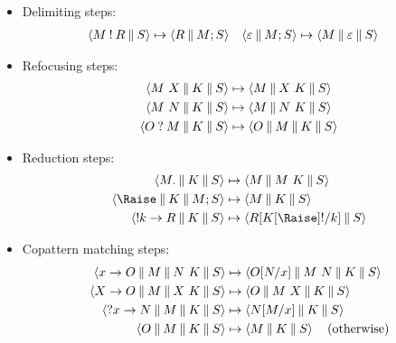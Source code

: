 \documentclass[sigplan,screen]{acmart}
\begin{document}
\begin{itemize}
\item Delimiting steps:
\begin{align*}
  \braket{M \ans R \cmid S}
  &\mapsto
  \braket{R \cmid M; S}
  &
  \braket{\varepsilon \cmid M; S}
  &\mapsto
  \braket{M \cmid \varepsilon \cmid S}
\end{align*}

\item Refocusing steps:
  \begin{align*}
  \braket{M ~ X \cmid K \cmid S}
  &\mapsto
  \braket{M \cmid X ~ K \cmid S}
  \\
  \braket{M ~ N \cmid K \cmid S}
  &\mapsto
  \braket{M \cmid N ~ K \cmid S}
  \\
  \braket{O \ask M \cmid K \cmid S}
  &\mapsto
  \braket{O \cmid M \cmid K \cmid S}
\end{align*}

\item Reduction steps:
  \begin{align*}
  \braket{M. \cmid K \cmid S}
  &\mapsto
  \braket{M \cmid M ~ K \cmid S}
  \\
  \braket{{\Raise} \cmid K \cmid M; S}
  &\mapsto
  \braket{M \cmid K \cmid S}
  \\
  \braket{\ans k \to R \cmid K \cmid S}
  &\mapsto
  \braket{R\subst{k}{K[\Raise]\ans} \cmid S}
\end{align*}

\item Copattern matching steps:
  \begin{align*}
  \braket{x \to O \cmid M \cmid N~K \cmid S}
  &\mapsto
  \braket{O\subst{x}{N} \cmid M~N \cmid K \cmid S}
  \\
  \braket{X \to O \cmid M \cmid X~K \cmid S}
  &\mapsto
  \braket{O \cmid M~X \cmid K \cmid S}
  \\
  \braket{\ask x \to N \cmid M \cmid K \cmid S}
  &\mapsto
  \braket{N\subst{x}{M} \cmid K \cmid S}
  \\
  \braket{O \cmid M \cmid K \cmid S}
  &\mapsto
  \braket{M \cmid K \cmid S}
  \quad(\text{otherwise})
\end{align*}
\end{itemize}
\end{document}
